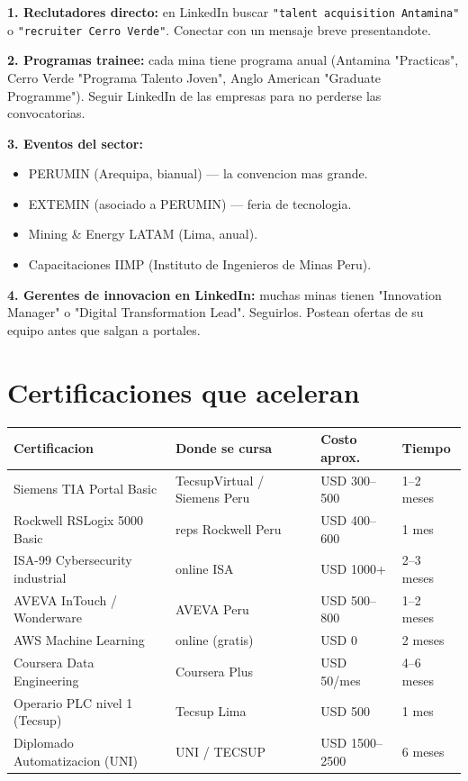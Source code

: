 \documentclass[11pt,a4paper,oneside]{report}
\begin{document}
\begin{tip}
\textbf{1. Reclutadores directo:} en LinkedIn buscar
\texttt{"talent acquisition Antamina"} o \texttt{"recruiter Cerro Verde"}.
Conectar con un mensaje breve presentandote.

\textbf{2. Programas trainee:} cada mina tiene programa anual (Antamina
"Practicas", Cerro Verde "Programa Talento Joven", Anglo American "Graduate
Programme"). Seguir LinkedIn de las empresas para no perderse las convocatorias.

\textbf{3. Eventos del sector:}
\begin{itemize}[leftmargin=1em]
  \item PERUMIN (Arequipa, bianual) --- la convencion mas grande.
  \item EXTEMIN (asociado a PERUMIN) --- feria de tecnologia.
  \item Mining \& Energy LATAM (Lima, anual).
  \item Capacitaciones IIMP (Instituto de Ingenieros de Minas Peru).
\end{itemize}

\textbf{4. Gerentes de innovacion en LinkedIn:} muchas minas tienen
"Innovation Manager" o "Digital Transformation Lead". Seguirlos. Postean
ofertas de su equipo antes que salgan a portales.
\end{tip}

\chapter{Certificaciones que aceleran}

\begin{center}
\begin{tabular}{p{4.5cm}p{4cm}p{2.5cm}p{2cm}}
\toprule
\textbf{Certificacion} & \textbf{Donde se cursa} & \textbf{Costo aprox.} & \textbf{Tiempo} \\
\midrule
Siemens TIA Portal Basic & TecsupVirtual / Siemens Peru & USD 300--500 & 1--2 meses \\
Rockwell RSLogix 5000 Basic & reps Rockwell Peru & USD 400--600 & 1 mes \\
ISA-99 Cybersecurity industrial & online ISA & USD 1000+ & 2--3 meses \\
AVEVA InTouch / Wonderware & AVEVA Peru & USD 500--800 & 1--2 meses \\
AWS Machine Learning   & online (gratis) & USD 0 & 2 meses \\
Coursera Data Engineering & Coursera Plus & USD 50/mes & 4--6 meses \\
Operario PLC nivel 1 (Tecsup) & Tecsup Lima & USD 500 & 1 mes \\
Diplomado Automatizacion (UNI) & UNI / TECSUP & USD 1500--2500 & 6 meses \\
\bottomrule
\end{tabular}
\end{center}
\end{document}
